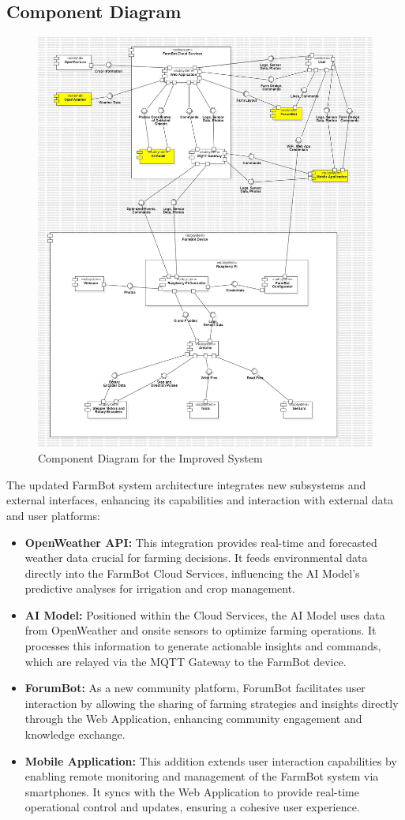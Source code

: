 \subsection{Component Diagram}
\begin{figure}[htbp]
    \centering
    \includegraphics[width=0.8\linewidth]{Figures/improved_component_diagram.jpg}
    \caption{Component Diagram for the Improved System}
    \label{ComponentImproved}
\end{figure}
\newpage
The updated FarmBot system architecture integrates new subsystems and external interfaces, enhancing its capabilities and interaction with external data and user platforms:
\begin{itemize}
    \item \textbf{OpenWeather API:} This integration provides real-time and forecasted weather data crucial for farming decisions. It feeds environmental data directly into the FarmBot Cloud Services, influencing the AI Model's predictive analyses for irrigation and crop management.
    \item \textbf{AI Model:} Positioned within the Cloud Services, the AI Model uses data from OpenWeather and onsite sensors to optimize farming operations. It processes this information to generate actionable insights and commands, which are relayed via the MQTT Gateway to the FarmBot device.
    \item \textbf{ForumBot:} As a new community platform, ForumBot facilitates user interaction by allowing the sharing of farming strategies and insights directly through the Web Application, enhancing community engagement and knowledge exchange.
    \item \textbf{Mobile Application:} This addition extends user interaction capabilities by enabling remote monitoring and management of the FarmBot system via smartphones. It syncs with the Web Application to provide real-time operational control and updates, ensuring a cohesive user experience.
\end{itemize}
